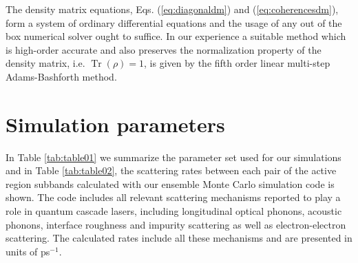 \documentclass[10pt]{article}
\DeclareMathOperator{\Tr}{Tr}
\begin{document}
\begin{appendices}
The density matrix equations, Eqs. (\ref{eq:diagonaldm}) and
(\ref{eq:coherencesdm}), form a system of ordinary differential equations
and the usage of any out of the box numerical solver ought to suffice. In our
experience a suitable method which is high-order accurate and also preserves
the normalization property of the density matrix, i.e. $\Tr(\rho)=1$, is given
by the fifth order linear multi-step Adams-Bashforth method.

\section{Simulation parameters}		
\label{sec:params}

In Table \ref{tab:table01} we summarize the parameter set
used for our simulations and in Table \ref{tab:table02}, the scattering rates
between each pair of the active region subbands calculated with our ensemble
Monte Carlo simulation code \cite{jirauschek2014modeling} is shown. The code
includes all relevant scattering mechanisms reported to play a role in quantum
cascade lasers, including longitudinal optical phonons, acoustic phonons,
interface roughness and impurity scattering as well as electron-electron
scattering. The calculated rates include all these mechanisms and are
presented in units of ps$^{-1}$.
\newpage
\begin{table}[htb]
\end{table}
\end{appendices}
\end{document}
